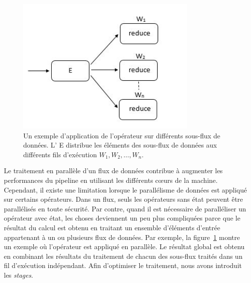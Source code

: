 \begin{figure}[ht]
\centering
     \includegraphics[width=0.8\textwidth]{Figures/StageDataParallel.jpg}
      \caption[Un exemple d'application de l'op\'erateur  sur diff\'erents sous-flux de donn\'ees.]{Un exemple d'application de l'op\'erateur  sur diff\'erents sous-flux de donn\'ees. L' E distribue  les \'el\'ements des sous-flux de donn\'ees aux diff\'erents fils d'ex\'ecution $W_1, W_2, \ldots, W_n$.}
       \label{StageDataParallel.fig}
\end{figure}

Le traitement en parall\`ele d'un flux de donn\'ees contribue \`a augmenter les performances du pipeline en utilisant les diff\'erents cœurs de la machine. Cependant, il existe une limitation lorsque le parall\'elisme de donn\'ees est appliqu\'e sur certains op\'erateurs. Dans un flux, seuls les op\'erateurs sans \'etat peuvent \^etre parall\'elis\'es en toute s\'ecurit\'e. Par contre, quand il est n\'ecessaire de parall\'eliser un op\'erateur avec \'etat, les choses deviennent un peu plus compliqu\'ees parce que le r\'esultat du calcul est obtenu en traitant un ensemble d'\'el\'ements d'entrée appartenant \`a un ou plusieurs flux de donn\'ees. Par exemple, la figure~\ref{StageDataParallel.fig} montre un exemple o\`u l'op\'erateur  est appliqu\'e en parall\`ele. Le r\'esultat global est obtenu en combinant les r\'esultats du traitement de chacun des sous-flux trait\'es dans un fil d'ex\'ecution ind\'ependant. Afin d'optimiser le traitement, nous avons introduit les \emph{stages}.


